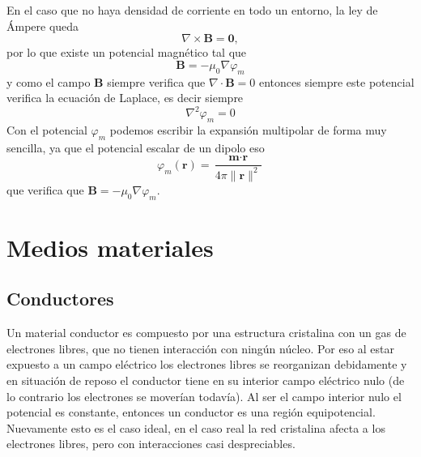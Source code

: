 \documentclass[11pt,a4paper]{article}
\numberwithin{equation}{section}
\begin{document}
En el caso que no haya densidad de corriente en todo un entorno, la ley de Ámpere queda \[\nabla \times \textbf{B} = \textbf{0},\] por lo que existe un potencial magnético tal que
\begin{equation}
    \textbf{B} = -\mu_0 \nabla \varphi_m
    \label{eq:m_potencial_escalar}
\end{equation}
y como el campo $\textbf{B}$ siempre verifica que $\nabla \cdot \textbf{B} = 0$ entonces siempre este potencial verifica la ecuación de Laplace, es decir siempre
\begin{equation}
    \nabla^2 \varphi_m = 0
    \label{eq:m_potencial_escalar_laplace}
\end{equation}
Con el potencial $\varphi_m$ podemos escribir la expansión multipolar de forma muy sencilla, ya que el potencial escalar de un dipolo eso
\begin{equation}
    \varphi_m(\textbf{r}) = \frac{\textbf{m} \cdot \textbf{r}}{4\pi\|\textbf{r}\|^2}
    \label{eq:m_potencial_escalar_dipolo}
\end{equation}
que verifica que $\textbf{B} = -\mu_0 \nabla \varphi_m$.

\section{Medios materiales}
\label{sec:medios}


\subsection{Conductores}
Un material conductor es compuesto por una estructura cristalina con un gas de electrones libres, que no tienen interacción con ningún núcleo. Por eso al estar expuesto a un campo eléctrico los electrones libres se reorganizan debidamente y en situación de reposo el conductor tiene en su interior campo eléctrico nulo (de lo contrario los electrones se moverían todavía). Al ser el campo interior nulo el potencial es constante, entonces un conductor es una región equipotencial. Nuevamente esto es el caso ideal, en el caso real la red cristalina afecta a los electrones libres, pero con interacciones casi despreciables. 
\end{document}
